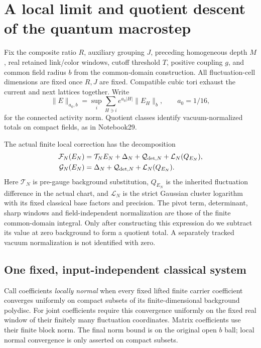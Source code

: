 \section{A local limit and quotient descent of the quantum macrostep}
\label{qll-section}

Fix the composite ratio \(R\), auxiliary grouping \(J\), preceding
homogeneous depth \(M\), real retained link/color windows, cutoff
threshold \(T\), positive coupling \(g\), and common field radius
\(b\) from the common-domain construction. All fluctuation-cell
dimensions are fixed once \(R,J\) are fixed. Compatible cubic
tori exhaust the current and next lattices together. Write
\[
 \|E\|_{a_0,b}
   =\sup_i\sum_{H\ni i}e^{a_0|H|}\|E_H\|_b,
 \qquad a_0=1/16,
\]
for the connected activity norm. Quotient classes identify
vacuum-normalized totals on compact fields, as in Notebook29.

The actual finite local correction has the decomposition
\begin{align}
 \mathcal F_N(E_N)
   &=\mathcal T_NE_N+\Delta_N+\mathcal Q_{{\rm det},N}
                         +\mathcal L_N(Q_{E_N}),\notag\\
 \mathcal G_N(E_N)
   &=\Delta_N+\mathcal Q_{{\rm det},N}
                         +\mathcal L_N(Q_{E_N}).
 \label{qll-finite-map}
\end{align}
Here \(\mathcal T_N\) is pre-gauge background substitution,
\(Q_{E_N}\) is the inherited fluctuation difference in the
actual chart, and \(\mathcal L_N\) is the strict Gaussian
cluster logarithm with its fixed classical base factors and
precision. The pivot term, determinant, sharp windows and
field-independent normalization are those of the finite
common-domain integral. Only after constructing this expression
do we subtract its value at zero background to form a quotient
total. A separately tracked vacuum normalization is not
identified with zero.

\subsection{One fixed, input-independent classical system}
\label{qll-data-section}

Call coefficients \emph{locally normal} when every fixed lifted
finite carrier coefficient converges uniformly on compact
subsets of its finite-dimensional background polydisc.
For joint coefficients require this convergence uniformly on
the fixed real window of their finitely many fluctuation
coordinates. Matrix coefficients use their finite block norm.
The final norm bound is on the original open \(b\) ball;
local normal convergence is only asserted on compact subsets.

